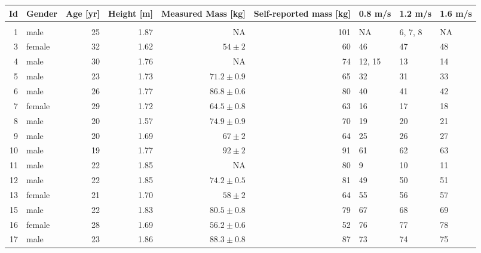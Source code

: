 \begin{tabular}{rlrrrrlll}
\toprule
 Id &  Gender &  Age [yr] & Height [m] &            Measured Mass [kg] & Self-reported mass [kg] & 0.8 m/s &  1.2 m/s & 1.6 m/s \\
\midrule
    &         &           &            &                               &                         &         &          &         \\
  1 &    male &        25 &       1.87 &                            NA &                     101 &      NA &  6, 7, 8 &      NA \\
  3 &  female &        32 &       1.62 &      $54\pm2$ &                      60 &      46 &       47 &      48 \\
  4 &    male &        30 &       1.76 &                            NA &                      74 &  12, 15 &       13 &      14 \\
  5 &    male &        23 &       1.73 &  $71.2\pm0.9$ &                      65 &      32 &       31 &      33 \\
  6 &    male &        26 &       1.77 &  $86.8\pm0.6$ &                      80 &      40 &       41 &      42 \\
  7 &  female &        29 &       1.72 &  $64.5\pm0.8$ &                      63 &      16 &       17 &      18 \\
  8 &    male &        20 &       1.57 &  $74.9\pm0.9$ &                      70 &      19 &       20 &      21 \\
  9 &    male &        20 &       1.69 &      $67\pm2$ &                      64 &      25 &       26 &      27 \\
 10 &    male &        19 &       1.77 &      $92\pm2$ &                      91 &      61 &       62 &      63 \\
 11 &    male &        22 &       1.85 &                            NA &                      80 &       9 &       10 &      11 \\
 12 &    male &        22 &       1.85 &  $74.2\pm0.5$ &                      81 &      49 &       50 &      51 \\
 13 &  female &        21 &       1.70 &      $58\pm2$ &                      64 &      55 &       56 &      57 \\
 15 &    male &        22 &       1.83 &  $80.5\pm0.8$ &                      79 &      67 &       68 &      69 \\
 16 &  female &        28 &       1.69 &  $56.2\pm0.6$ &                      52 &      76 &       77 &      78 \\
 17 &    male &        23 &       1.86 &  $88.3\pm0.8$ &                      87 &      73 &       74 &      75 \\
\bottomrule
\end{tabular}
